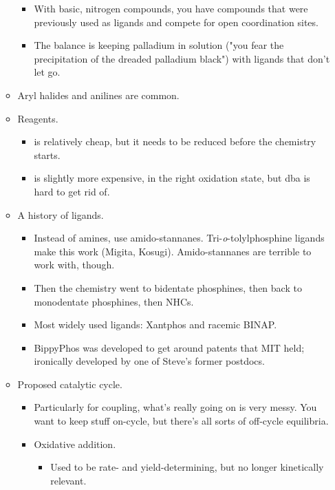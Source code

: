 \documentclass[../notes.tex]{subfiles}
\begin{document}
\begin{itemize}
\begin{itemize}
        \begin{itemize}
            \item With basic, nitrogen compounds, you have compounds that were previously used as ligands and compete for open coordination sites.
            \item The balance is keeping palladium in solution ("you fear the precipitation of the dreaded palladium black") with ligands that don't let go.
        \end{itemize}
        \item Aryl halides and anilines are common.
        \item Reagents.
        \begin{itemize}
            \item {} is relatively cheap, but it needs to be reduced before the chemistry starts.
            \item {} is slightly more expensive, in the right oxidation state, but dba is hard to get rid of.
        \end{itemize}
        \item A history of ligands.
        \begin{itemize}
            \item Instead of amines, use amido-stannanes. Tri-\emph{o}-tolylphosphine ligands make this work (Migita, Kosugi). Amido-stannanes are terrible to work with, though.
            \item Then the chemistry went to bidentate phosphines, then back to monodentate phosphines, then NHCs.
            \item Most widely used ligands: Xantphos and racemic BINAP.
            \item BippyPhos was developed to get around patents that MIT held; ironically developed by one of Steve's former postdocs.
        \end{itemize}
        \item Proposed catalytic cycle.
        \begin{itemize}
            \item Particularly for  coupling, what's really going on is very messy. You want to keep stuff on-cycle, but there's all sorts of off-cycle equilibria.
            \item Oxidative addition.
            \begin{itemize}
                \item Used to be rate- and yield-determining, but no longer kinetically relevant.

\end{itemize}
\end{itemize}
\end{itemize}
\end{itemize}
\end{document}
